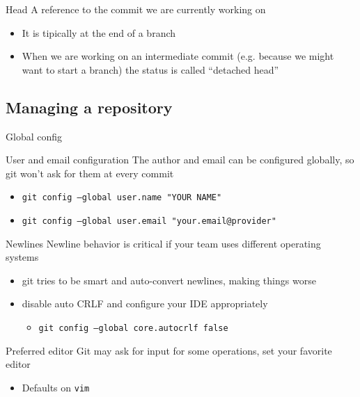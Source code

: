 \documentclass[presentation]{beamer}
\begin{document}
\begin{frame}{Head}
    A reference to the commit we are currently working on
    \begin{itemize}
        \item It is tipically at the end of a branch
        \item When we are working on an intermediate commit (e.g. because we might want to start a branch) the status is called ``detached head''
    \end{itemize}
\end{frame}

\subsection{Managing a repository}

\begin{frame}[allowframebreaks]{Global config}
    \begin{block}{User and email configuration}
        The author and email can be configured globally, so git won't ask for them at every commit
        \begin{itemize}
            \item \texttt{git config --global user.name "YOUR NAME"}
            \item \texttt{git config --global user.email "your.email@provider"}
        \end{itemize}
    \end{block}
    \begin{block}{Newlines}
        Newline behavior is critical if your team uses different operating systems
        \begin{itemize}
            \item git tries to be smart and auto-convert newlines, making things worse
            \item disable auto CRLF and configure your IDE appropriately
            \begin{itemize}
                \item \texttt{git config --global core.autocrlf false}
            \end{itemize}
        \end{itemize}
    \end{block}
    \begin{block}{Preferred editor}
        Git may ask for input for some operations, set your favorite editor
        \begin{itemize}
            \item Defaults on \texttt{vim}

\end{itemize}
\end{block}
\end{frame}
\end{document}
